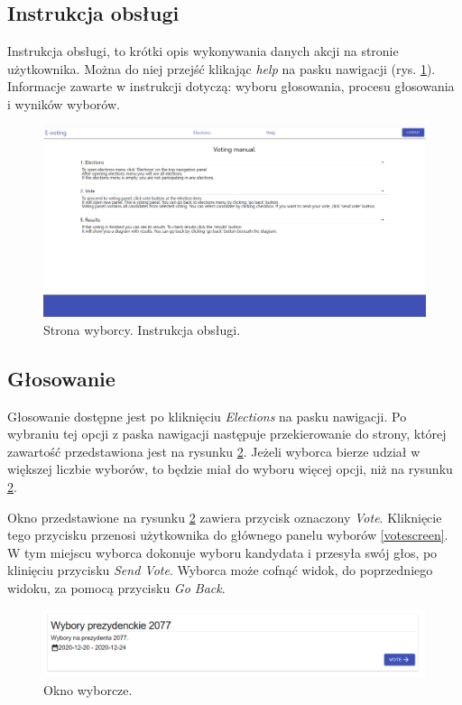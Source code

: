 \documentclass[a4paper,12pt]{book}
\begin{document}
\subsection{Instrukcja obsługi}

Instrukcja obsługi, to krótki opis wykonywania danych akcji na stronie użytkownika. Można do niej przejść klikając \textit{help} na pasku nawigacji (rys. \ref{manual}). Informacje zawarte w instrukcji dotyczą: wyboru głosowania, procesu głosowania i wyników wyborów.

\begin{figure}[H]
	\centering
	\includegraphics[width=\textwidth]{images/manual.png}
	\caption{Strona wyborcy. Instrukcja obsługi.}\label{manual}
\end {figure}

\newpage

\subsection{Głosowanie}

Głosowanie dostępne jest po kliknięciu \textit{Elections} na pasku nawigacji. Po wybraniu tej opcji z paska nawigacji następuje przekierowanie do strony, której zawartość przedstawiona jest na rysunku \ref{electionwindow}. Jeżeli wyborca bierze udział w większej liczbie wyborów, to będzie miał do wyboru więcej opcji, niż na rysunku \ref{electionwindow}.

Okno  przedstawione na rysunku \ref{electionwindow} zawiera przycisk oznaczony \textit{Vote}. Kliknięcie tego przycisku przenosi użytkownika do głównego panelu wyborów \ref{votescreen}. W tym miejscu wyborca dokonuje wyboru kandydata i przesyła swój głos, po klinięciu przycisku \textit{Send Vote}. Wyborca może cofnąć widok, do poprzedniego widoku, za pomocą przycisku \textit{Go Back}.

\begin{figure}[H]
	\centering
	\includegraphics[width=\textwidth]{images/electionwindow.png}
	\caption{Okno wyborcze.}\label{electionwindow}
\end {figure}
\end{document}
